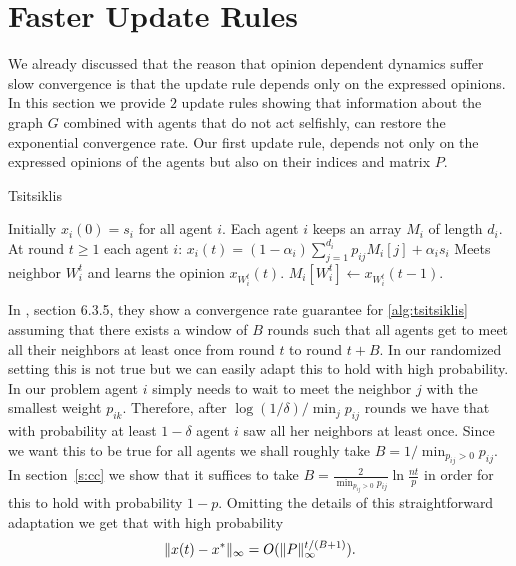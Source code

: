 \section{Faster Update Rules}\label{s:graph_aware}

We already discussed that the reason that opinion dependent dynamics suffer slow
convergence is that the update rule depends only on the expressed opinions.
In this section we provide $2$ update rules showing that information about the
graph $G$ combined with agents that do not act selfishly,
can restore the exponential convergence rate.
Our first update rule, depends not only on the expressed opinions of the
agents but also on their indices and matrix $P$.
\begin{algorithm}
  \caption{Tsitsiklis}
  \label{alg:tsitsiklis}
  \begin{algorithmic}[1]
    \STATE Initially $x_i(0) = s_i$ for all agent $i$.
    \STATE Each agent $i$ keeps an array $M_i$ of length $d_i$.
    \STATE At round $t\geq 1$ each agent $i$:
    \bindent
    \STATE $x_i(t) = (1-\alpha_i)\sum_{j=1}^{d_i} p_{ij} M_i[j] + \alpha_is_i$
    \STATE Meets neighbor $W_i^t$ and learns the opinion $x_{W_i^t}(t)$.
    \STATE $M_i[W_i^t] \gets x_{W_i^t}(t-1)$.
    
    \eindent
\end{algorithmic}
\end{algorithm}

In \cite{BT97}, section 6.3.5, they show a convergence rate guarantee for
\ref{alg:tsitsiklis} assuming that there exists
a window of $B$ rounds such that all agents get to meet all their
neighbors at least once from round $t$ to round $t+B$.
In our randomized setting this is not true but we can easily adapt this to
hold with high probability. In our problem
agent $i$ simply needs to wait to meet the neighbor $j$ with the smallest
weight $p_{ik}$. Therefore, after $\log(1/\delta)/\min_{j} p_{ij}$ rounds
we have that with probability at least $1-\delta$ agent $i$ saw all her
neighbors at least once.  Since we want this to be true for all agents
we shall roughly take $B = 1/\min_{p_{ij} > 0} {p_{ij}}$.
In section~\ref{s:cc} we show that it suffices to take $B = \frac{2}{\min_{p_{ij} > 0} {p_{ij}}}\ln\frac{nt}{p}$
in order for this to hold with probability $1-p$. 
Omitting the details of this straightforward adaptation
we get that with high probability
\[
  \| x(t) - x^* \|_{\infty} = O(\| P \|_{\infty}^{t/(B+1)}).
\]

